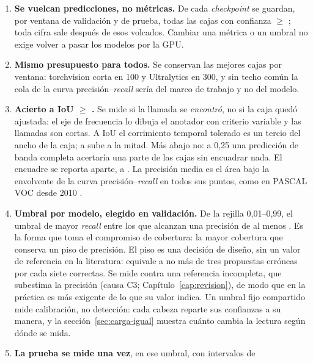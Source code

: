 \begin{enumerate}
    \item \textbf{Se vuelcan predicciones, no métricas.} De cada \textit{checkpoint}
          se guardan, por ventana de validación y de prueba, todas las cajas con
          confianza $\geq$ \mScoreFloor{}; toda cifra sale después de esos
          volcados. Cambiar una métrica o un umbral no exige volver a pasar los
          modelos por la GPU.
    \item \textbf{Mismo presupuesto para todos.} Se conservan las \mMaxDet{}
          mejores cajas por ventana: torchvision corta en 100 y Ultralytics en
          300, y sin techo común la cola de la curva precisión--\textit{recall}
          sería del marco de trabajo y no del modelo.
    \item \textbf{Acierto a IoU $\geq$ \pMatchIou{}.} Se mide si la llamada se
          \emph{encontró}, no si la caja quedó ajustada: el eje de frecuencia lo
          dibuja el anotador con criterio variable y las llamadas son cortas. A
          IoU \pStrictIou{} el corrimiento temporal tolerado es un tercio del
          ancho de la caja; a \pMatchIou{} sube a la mitad. Más abajo no: a 0,25
          una predicción de banda completa acertaría una parte de las cajas sin
          encuadrar nada. El encuadre se reporta aparte, a \pStrictIou{}. La precisión media es el área bajo la
          envolvente de la curva precisión--\textit{recall} en todos sus puntos,
          como en PASCAL VOC desde 2010 \citep{everingham_retrospective_2015}.
    \item \textbf{Umbral por modelo, elegido en validación.} De la rejilla
          0,01--0,99, el umbral de mayor \textit{recall} entre los que alcanzan
          una precisión de al menos \pMinPrecision{}. Es la forma que toma el
          compromiso de cobertura: la mayor cobertura que conserva un piso de
          precisión. El piso es una decisión de diseño, sin un valor de
          referencia en la literatura: \pMinPrecision{} equivale a no más de tres
          propuestas erróneas por cada siete correctas. Se mide contra una
          referencia incompleta, que subestima la precisión (causa C3;
          Capítulo~\ref{cap:revision}), de modo que en la práctica es más
          exigente de lo que su valor indica. Un umbral fijo compartido
          mide calibración, no detección: cada cabeza reparte sus confianzas a su
          manera, y la sección~\ref{sec:carga-igual} muestra cuánto cambia la
          lectura según dónde se mida.
    \item \textbf{La prueba se mide una vez}, en ese umbral, con intervalos de

\end{enumerate}
